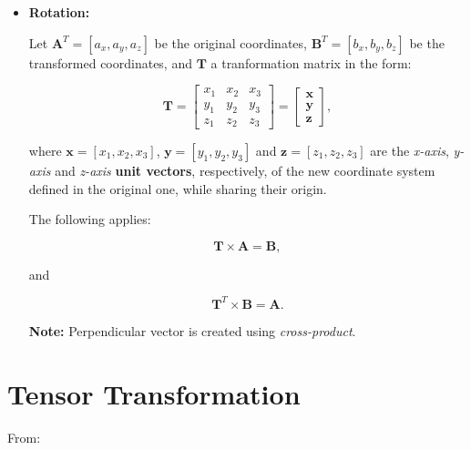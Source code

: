 \documentclass[10pt,b5paper,titlepage]{book}
\begin{document}
\begin{itemize}
    \item \textbf{Rotation:}

        Let $\mathbf{A}^{T} = [a_{x}, a_{y}, a_{z}]$ be the original coordinates,
        $\mathbf{B}^{T} = [b_{x}, b_{y}, b_{z}]$ be the transformed coordinates, and
        $\mathbf{T}$ a tranformation matrix in the form:

        \begin{equation}
            \mathbf{T} = \begin{bmatrix}
                x_1 & x_2 & x_3 \\
                y_1 & y_2 & y_3 \\
                z_1 & z_2 & z_3
            \end{bmatrix} = \begin{bmatrix}
                \mathbf{x} \\
                \mathbf{y} \\
                \mathbf{z}
            \end{bmatrix}
        ,\end{equation}

        where $\mathbf{x} = [x_1, x_2, x_3]$, $\mathbf{y} = [y_1, y_2, y_3]$ and
        $\mathbf{z} = [z_1, z_2, z_3]$ are the \textit{x-axis}, \textit{y-axis} and
        \textit{z-axis} \textbf{unit vectors}, respectively, of the new coordinate
        system defined in the original one, while sharing their origin.

        The following applies:

        \begin{equation}
            \mathbf{T} \times \mathbf{A} = \mathbf{B}
        ,\end{equation}

        and

        \begin{equation}
            \mathbf{T}^{T} \times \mathbf{B} = \mathbf{A}
        .\end{equation}

        \textbf{Note:} Perpendicular vector is  created using \textit{cross-product}.
\end{itemize}


\section{Tensor Transformation}

From:
\end{document}
